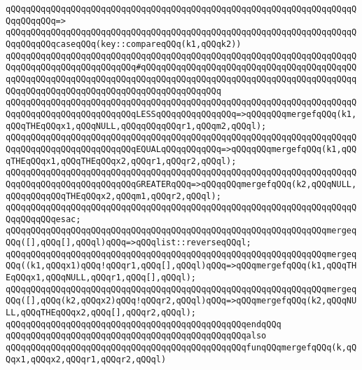 \verb|qQQqqQQqqQQqqQQqqQQqqQQqqQQqqQQqqQQqqQQqqQQqqQQqqQQqqQQqqQQqqQQqqQQqqQQqqQQqqQQq=>|\newline
\verb|qQQqqQQqqQQqqQQqqQQqqQQqqQQqqQQqqQQqqQQqqQQqqQQqqQQqqQQqqQQqqQQqqQQqqQQqqQQqqQQqcaseqQQq(key::compareqQQq(k1,qQQqk2))|\newline
\verb|qQQqqQQqqQQqqQQqqQQqqQQqqQQqqQQqqQQqqQQqqQQqqQQqqQQqqQQqqQQqqQQqqQQqqQQqqQQqqQQqqQQqqQQqqQQqqQQq#qQQqqQQqqQQqqQQqqQQqqQQqqQQqqQQqqQQqqQQqqQQqqQQqqQQqqQQqqQQqqQQqqQQqqQQqqQQqqQQqqQQqqQQqqQQqqQQqqQQqqQQqqQQqqQQqqQQqqQQqqQQqqQQqqQQqqQQqqQQqqQQqqQQqqQQqqQQq|\newline
\verb|qQQqqQQqqQQqqQQqqQQqqQQqqQQqqQQqqQQqqQQqqQQqqQQqqQQqqQQqqQQqqQQqqQQqqQQqqQQqqQQqqQQqqQQqqQQqqQQqLESSqQQqqQQqqQQqqQQq=>qQQqqQQqmergefqQQq(k1,qQQqTHEqQQqx1,qQQqNULL,qQQqqQQqqQQqr1,qQQqm2,qQQql);|\newline
\verb|qQQqqQQqqQQqqQQqqQQqqQQqqQQqqQQqqQQqqQQqqQQqqQQqqQQqqQQqqQQqqQQqqQQqqQQqqQQqqQQqqQQqqQQqqQQqqQQqEQUALqQQqqQQqqQQq=>qQQqqQQqmergefqQQq(k1,qQQqTHEqQQqx1,qQQqTHEqQQqx2,qQQqr1,qQQqr2,qQQql);|\newline
\verb|qQQqqQQqqQQqqQQqqQQqqQQqqQQqqQQqqQQqqQQqqQQqqQQqqQQqqQQqqQQqqQQqqQQqqQQqqQQqqQQqqQQqqQQqqQQqqQQqGREATERqQQq=>qQQqqQQqmergefqQQq(k2,qQQqNULL,qQQqqQQqqQQqTHEqQQqx2,qQQqm1,qQQqr2,qQQql);|\newline
\verb|qQQqqQQqqQQqqQQqqQQqqQQqqQQqqQQqqQQqqQQqqQQqqQQqqQQqqQQqqQQqqQQqqQQqqQQqqQQqqQQqesac;|\newline
\newline
\verb|qQQqqQQqqQQqqQQqqQQqqQQqqQQqqQQqqQQqqQQqqQQqqQQqqQQqqQQqqQQqqQQqmergeqQQq([],qQQq[],qQQql)qQQq=>qQQqlist::reverseqQQql;|\newline
\verb|qQQqqQQqqQQqqQQqqQQqqQQqqQQqqQQqqQQqqQQqqQQqqQQqqQQqqQQqqQQqqQQqmergeqQQq((k1,qQQqx1)qQQq!qQQqr1,qQQq[],qQQql)qQQq=>qQQqmergefqQQq(k1,qQQqTHEqQQqx1,qQQqNULL,qQQqr1,qQQq[],qQQql);|\newline
\verb|qQQqqQQqqQQqqQQqqQQqqQQqqQQqqQQqqQQqqQQqqQQqqQQqqQQqqQQqqQQqqQQqmergeqQQq([],qQQq(k2,qQQqx2)qQQq!qQQqr2,qQQql)qQQq=>qQQqmergefqQQq(k2,qQQqNULL,qQQqTHEqQQqx2,qQQq[],qQQqr2,qQQql);|\newline
\verb|qQQqqQQqqQQqqQQqqQQqqQQqqQQqqQQqqQQqqQQqqQQqqQQqendqQQq|\newline
\newline
\verb|qQQqqQQqqQQqqQQqqQQqqQQqqQQqqQQqqQQqqQQqqQQqqQQqalso|\newline
\verb|qQQqqQQqqQQqqQQqqQQqqQQqqQQqqQQqqQQqqQQqqQQqqQQqfunqQQqmergefqQQq(k,qQQqx1,qQQqx2,qQQqr1,qQQqr2,qQQql)|\newline
